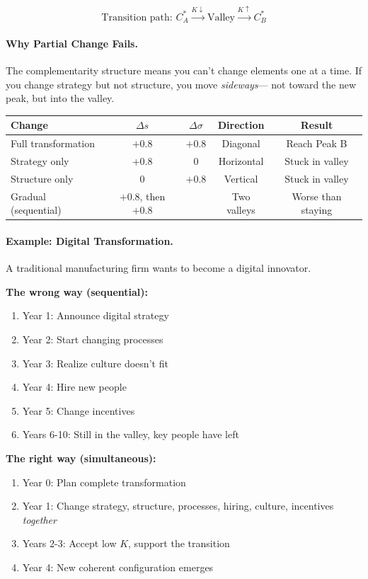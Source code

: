 \documentclass[12pt,a4paper]{article}
\begin{document}
\begin{equation}
  \text{Transition path: } 
  C^*_A \xrightarrow{K \downarrow} \text{Valley} 
        \xrightarrow{K \uparrow} C^*_B
\end{equation}

\paragraph{Why Partial Change Fails.}
The complementarity structure means you can't change elements one at a time.
If you change strategy but not structure, you move \emph{sideways}---
not toward the new peak, but into the valley.

\begin{center}
\renewcommand{\arraystretch}{1.2}
\begin{tabular}{lcccc}
\hline
\textbf{Change} & $\Delta s$ & $\Delta \sigma$ & Direction & Result \\
\hline
Full transformation & $+0.8$ & $+0.8$ & Diagonal & Reach Peak B \\
Strategy only & $+0.8$ & $0$ & Horizontal & Stuck in valley \\
Structure only & $0$ & $+0.8$ & Vertical & Stuck in valley \\
Gradual (sequential) & $+0.8$, then $+0.8$ & & Two valleys & Worse than staying \\
\hline
\end{tabular}
\end{center}

\paragraph{Example: Digital Transformation.}
A traditional manufacturing firm wants to become a digital innovator.

\textbf{The wrong way (sequential):}
\begin{enumerate}
  \item Year 1: Announce digital strategy
  \item Year 2: Start changing processes
  \item Year 3: Realize culture doesn't fit
  \item Year 4: Hire new people
  \item Year 5: Change incentives
  \item Years 6-10: Still in the valley, key people have left
\end{enumerate}

\textbf{The right way (simultaneous):}
\begin{enumerate}
  \item Year 0: Plan complete transformation
  \item Year 1: Change strategy, structure, processes, hiring, culture, incentives \emph{together}
  \item Years 2-3: Accept low $K$, support the transition
  \item Year 4: New coherent configuration emerges
\end{enumerate}
\end{document}

